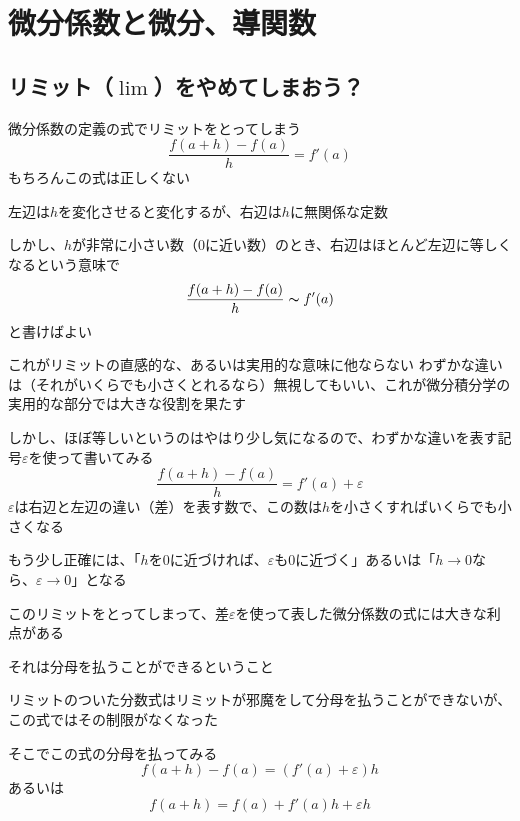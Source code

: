 \documentclass[../book_infinite_continuous_math]{subfiles}
\begin{document}
\section{微分係数と微分、導関数}

\subsection{リミット（$\lim$）をやめてしまおう？}

微分係数の定義の式でリミットをとってしまう
\begin{equation*}
  \dfrac{f(a+h)-f(a)}{h} = f'(a)
\end{equation*}
もちろんこの式は正しくない

左辺は$h$を変化させると変化するが、右辺は$h$に無関係な定数

\br

しかし、$h$が非常に小さい数（$0$に近い数）のとき、右辺はほとんど左辺に等しくなるという意味で
\begin{equation*}
  \dfrac{f(a+h)-f(a)}{h} \thicksim f'(a)
\end{equation*}
と書けばよい

\br

これがリミットの直感的な、あるいは実用的な意味に他ならない
わずかな違いは（それがいくらでも小さくとれるなら）無視してもいい、これが微分積分学の実用的な部分では大きな役割を果たす

\br

しかし、ほぼ等しいというのはやはり少し気になるので、わずかな違いを表す記号$\varepsilon$を使って書いてみる
\begin{equation*}
  \dfrac{f(a+h)-f(a)}{h} = f'(a) + \varepsilon
\end{equation*}
$\varepsilon$は右辺と左辺の違い（差）を表す数で、この数は$h$を小さくすればいくらでも小さくなる

もう少し正確には、「$h$を$0$に近づければ、$\varepsilon$も$0$に近づく」あるいは「$h \to 0$なら、$\varepsilon \to 0$」となる

\br

このリミットをとってしまって、差$\varepsilon$を使って表した微分係数の式には大きな利点がある

それは分母を払うことができるということ

\br

リミットのついた分数式はリミットが邪魔をして分母を払うことができないが、この式ではその制限がなくなった

そこでこの式の分母を払ってみる
\begin{equation*}
  f(a+h)-f(a) = (f'(a) + \varepsilon)h
\end{equation*}
あるいは
\begin{equation*}
  f(a+h) = f(a) + f'(a)h + \varepsilon h
\end{equation*}
\end{document}
